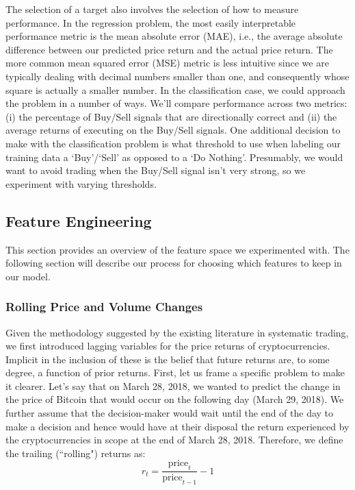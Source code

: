 \documentclass[12pt,twoside]{article}
\begin{document}
The selection of a target also involves the selection of how to measure performance. In the regression problem, the most easily interpretable performance metric is the mean absolute error (MAE), i.e., the average absolute difference between our predicted price return and the actual price return. The more common mean squared error (MSE) metric is less intuitive since we are typically dealing with decimal numbers smaller than one, and consequently whose square is actually a smaller number. In the classification case, we could approach the problem in a number of ways. We'll compare performance across two metrics: (i) the percentage of Buy/Sell signals that are directionally correct and (ii) the average returns of executing on the Buy/Sell signals. One additional decision to make with the classification problem is what threshold to use when labeling our training data a `Buy'/`Sell' as opposed to a `Do Nothing'. Presumably, we would want to avoid trading when the Buy/Sell signal isn't very strong, so we experiment with varying thresholds.

\subsection{Feature Engineering}

This section provides an overview of the feature space we experimented with. The following section will describe our process for choosing which features to keep in our model.

\subsubsection{Rolling Price and Volume Changes}

Given the methodology suggested by the existing literature in systematic trading, we first introduced lagging variables for the price returns of cryptocurrencies. Implicit in the inclusion of these is the belief that future returns are, to some degree, a function of prior returns. First, let us frame a specific problem to make it clearer. Let's say that on March 28, 2018, we wanted to predict the change in the price of Bitcoin that would occur on the following day (March 29, 2018). We further assume that the decision-maker would wait until the end of the day to make a decision and hence would have at their disposal the return experienced by the cryptocurrencies in scope at the end of March 28, 2018. Therefore, we define the trailing (``rolling") returns as:
$$r_t = \frac{\text{price}_t}{\text{price}_{t-1}} - 1$$
\end{document}
